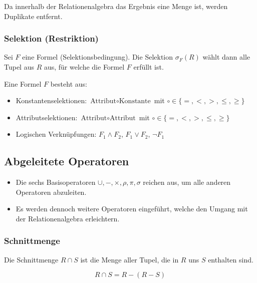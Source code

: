                 Da innerhalb der Relationenalgebra das Ergebnis eine Menge ist, werden Duplikate entfernt.

            \subsubsection{Selektion (Restriktion)} %
                Sei \(F\) eine Formel (Selektionsbedingung). Die Selektion \(\sigma_F(R)\) wählt dann alle Tupel aus \(R\) aus, für welche die Formel \(F\) erfüllt ist.
                
                Eine Formel \(F\) besteht aus:
                \begin{itemize}
                	\item Konstantenselektionen:   \tabto{5cm} \( \text{Attribut} \circ \text{Konstante} \) mit \( \circ \in \{ =, <, >, \leq, \geq \} \)
                	\item Attributselektionen:     \tabto{5cm} \( \text{Attribut} \circ \text{Attribut} \) mit \( \circ \in \{ =, <, >, \leq, \geq \} \)
                	\item Logischen Verknüpfungen: \tabto{5cm} \( F_1 \land F_2 \), \( F_1 \lor F_2 \), \( \lnot F_1 \)
                \end{itemize}

        \subsection{Abgeleitete Operatoren} %
            \begin{itemize}
            	\item Die sechs Basisoperatoren \( \cup, -, \times, \rho, \pi, \sigma \) reichen aus, um alle anderen Operatoren abzuleiten.
            	\item Es werden dennoch weitere Operatoren eingeführt, welche den Umgang mit der Relationenalgebra erleichtern.
            \end{itemize}

            \subsubsection{Schnittmenge} %
                Die Schnittmenge \( R \cap S \) ist die Menge aller Tupel, die in \(R\) uns \(S\) enthalten sind.
                
                \begin{equation*}
                    R \cap S = R - (R - S)
                \end{equation*}
                

